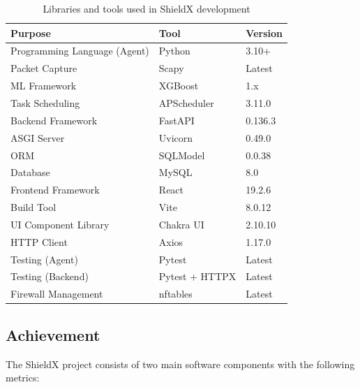 \documentclass[../Main.tex]{subfiles}
\begin{document}
\begin{table}[H]
\centering
\small
\begin{tabular}{|l|l|l|}
\hline
\textbf{Purpose} & \textbf{Tool} & \textbf{Version} \\
\hline
Programming Language (Agent) & Python & 3.10+ \\
Packet Capture & Scapy & Latest \\
ML Framework & XGBoost & 1.x \\
Task Scheduling & APScheduler & 3.11.0 \\
Backend Framework & FastAPI & 0.136.3 \\
ASGI Server & Uvicorn & 0.49.0 \\
ORM & SQLModel & 0.0.38 \\
Database & MySQL & 8.0 \\
Frontend Framework & React & 19.2.6 \\
Build Tool & Vite & 8.0.12 \\
UI Component Library & Chakra UI & 2.10.10 \\
HTTP Client & Axios & 1.17.0 \\
Testing (Agent) & Pytest & Latest \\
Testing (Backend) & Pytest + HTTPX & Latest \\
Firewall Management & nftables & Latest \\
\hline
\end{tabular}
\caption{Libraries and tools used in ShieldX development}
\label{tab:tools}
\end{table}

\subsection{Achievement}
\label{section:4.3.2}

The ShieldX project consists of two main software components with the following metrics:
\end{document}
